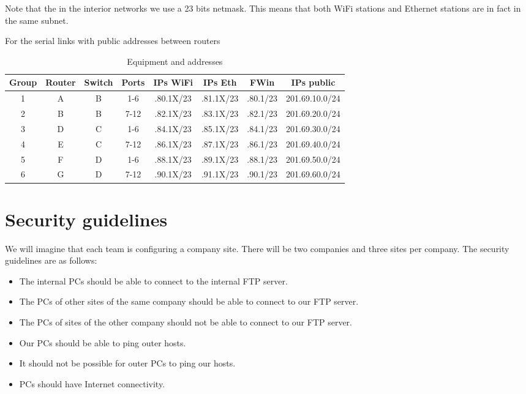 Note that the in the interior networks we use a 23 bits netmask.
This means that both WiFi stations and Ethernet stations are in fact in the same subnet.

For the serial links with public addresses between routers 
\begin{table}
\sffamily\small
\centering
\begin{tabular}{cccccccc}
\hline
Group & Router & Switch & Ports & IPs WiFi & IPs Eth & FWin & IPs public \\
\hline
1 & A & B & 1-6 & .80.1X/23 & .81.1X/23 & .80.1/23 & 201.69.10.0/24 \\
2 & B & B & 7-12 & .82.1X/23 & .83.1X/23 & .82.1/23 & 201.69.20.0/24 \\
3 & D & C & 1-6 & .84.1X/23 & .85.1X/23 & .84.1/23 & 201.69.30.0/24 \\
4 & E & C & 7-12 & .86.1X/23 & .87.1X/23 & .86.1/23 & 201.69.40.0/24 \\
5 & F & D & 1-6 & .88.1X/23 & .89.1X/23 & .88.1/23 & 201.69.50.0/24 \\
6 & G & D & 7-12 & .90.1X/23 & .91.1X/23 & .90.1/23 & 201.69.60.0/24 \\

\end{tabular}
\caption{Equipment and addresses}
\label{tab:equipment-and-addresses}
\end{table}

\section{Security guidelines}
We will imagine that each team is configuring a company site.
There will be two companies and three sites per company.
The security guidelines are as follows:
\begin{itemize}
\item The internal PCs should be able to connect to the internal FTP server.
\item The PCs of other sites of the same company should be able to connect to our FTP server.
\item The PCs of sites of the other company should not be able to connect to our FTP server.
\item Our PCs should be able to ping outer hosts.
\item It should not be possible for outer PCs to ping our hosts.
\item PCs should have Internet connectivity.
\end{itemize}

